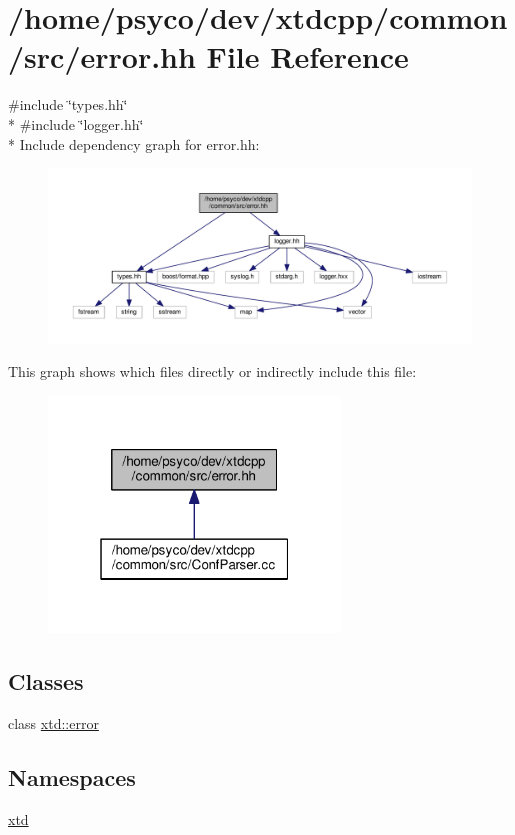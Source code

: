 \hypertarget{error_8hh}{}\section{/home/psyco/dev/xtdcpp/common/src/error.hh File Reference}
\label{error_8hh}
{\ttfamily \#include \char`\"{}types.\+hh\char`\"{}}\\*
{\ttfamily \#include \char`\"{}logger.\+hh\char`\"{}}\\*
Include dependency graph for error.\+hh\+:
\nopagebreak
\begin{figure}[H]
\begin{center}
\leavevmode
\includegraphics[width=350pt]{error_8hh__incl}
\end{center}
\end{figure}
This graph shows which files directly or indirectly include this file\+:
\nopagebreak
\begin{figure}[H]
\begin{center}
\leavevmode
\includegraphics[width=220pt]{error_8hh__dep__incl}
\end{center}
\end{figure}
\subsection*{Classes}
\begin{DoxyCompactItemize}
\item 
class \hyperlink{classxtd_1_1error}{xtd\+::error}
\end{DoxyCompactItemize}
\subsection*{Namespaces}
\begin{DoxyCompactItemize}
\item 
 \hyperlink{namespacextd}{xtd}
\end{DoxyCompactItemize}
